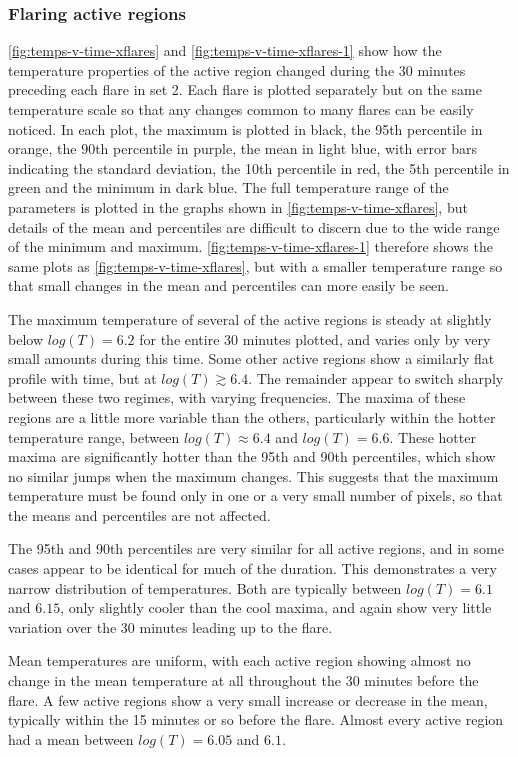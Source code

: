\documentclass{article}
\begin{document}
\subsubsection{Flaring active regions}
\ref{fig:temps-v-time-xflares} and \ref{fig:temps-v-time-xflares-1}
show how the temperature properties of the active region changed during
the 30 minutes preceding each flare in set 2. Each flare is plotted
separately but on the same temperature scale so that any changes common
to many flares can be easily noticed. In each plot, the maximum is
plotted in black, the 95th percentile in orange, the 90th percentile
in purple, the mean in light blue, with error bars indicating the
standard deviation, the 10th percentile in red, the 5th percentile
in green and the minimum in dark blue. The full temperature range
of the parameters is plotted in the graphs shown in \ref{fig:temps-v-time-xflares},
but details of the mean and percentiles are difficult to discern due
to the wide range of the minimum and maximum. \ref{fig:temps-v-time-xflares-1}
therefore shows the same plots as \ref{fig:temps-v-time-xflares},
but with a smaller temperature range so that small changes in the
mean and percentiles can more easily be seen.

The maximum temperature of several of the active regions is steady
at slightly below $log(T)=6.2$ for the entire 30 minutes plotted,
and varies only by very small amounts during this time. Some other
active regions show a similarly flat profile with time, but at $log(T)\gtrsim6.4$.
The remainder appear to switch sharply between these two regimes,
with varying frequencies. The maxima of these regions are a little
more variable than the others, particularly within the hotter temperature
range, between $log(T)\approx6.4$ and $log(T)=6.6$. These hotter
maxima are significantly hotter than the 95th and 90th percentiles,
which show no similar jumps when the maximum changes. This suggests
that the maximum temperature must be found only in one or a very small
number of pixels, so that the means and percentiles are not affected.

The 95th and 90th percentiles are very similar for all active regions,
and in some cases appear to be identical for much of the duration.
This demonstrates a very narrow distribution of temperatures. Both
are typically between $log(T)=6.1$ and $6.15$, only slightly cooler
than the cool maxima, and again show very little variation over the
30 minutes leading up to the flare.

Mean temperatures are uniform, with each active region showing almost
no change in the mean temperature at all throughout the 30 minutes
before the flare. A few active regions show a very small increase
or decrease in the mean, typically within the 15 minutes or so before
the flare. Almost every active region had a mean between $log(T)=6.05$
and $6.1$.
\end{document}
